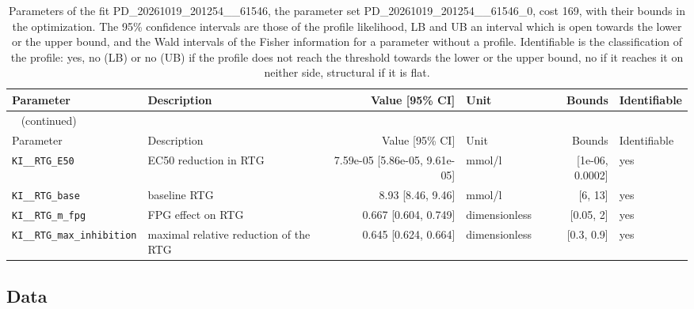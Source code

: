 \begin{longtable}{llrlrl}
\caption{Parameters of the fit PD\_20261019\_201254\_\_61546, the parameter set PD\_20261019\_201254\_\_61546\_0, cost 169, with their bounds in the optimization. The 95\% confidence intervals are those of the profile likelihood, LB and UB an interval which is open towards the lower or the upper bound, and the Wald intervals of the Fisher information for a parameter without a profile. Identifiable is the classification of the profile: yes, no (LB) or no (UB) if the profile does not reach the threshold towards the lower or the upper bound, no if it reaches it on neither side, structural if it is flat.}\label{tab:parameters:PD_20261019_201254__61546} \\
\toprule
Parameter & Description & Value [95\% CI] & Unit & Bounds & Identifiable \\
\midrule
\endfirsthead
\multicolumn{6}{l}{\small\tablename~\thetable{} (continued)} \\
\toprule
Parameter & Description & Value [95\% CI] & Unit & Bounds & Identifiable \\
\midrule
\endhead
\bottomrule
\endlastfoot
\texttt{KI\_\_RTG\_E50} & EC50 reduction in RTG & 7.59e-05 [5.86e-05, 9.61e-05] & mmol/l & [1e-06, 0.0002] & yes \\
\texttt{KI\_\_RTG\_base} & baseline RTG & 8.93 [8.46, 9.46] & mmol/l & [6, 13] & yes \\
\texttt{KI\_\_RTG\_m\_fpg} & FPG effect on RTG & 0.667 [0.604, 0.749] & dimensionless & [0.05, 2] & yes \\
\texttt{KI\_\_RTG\_max\_inhibition} & maximal relative reduction of the RTG & 0.645 [0.624, 0.664] & dimensionless & [0.3, 0.9] & yes \\
\end{longtable}

\subsection{Data}

